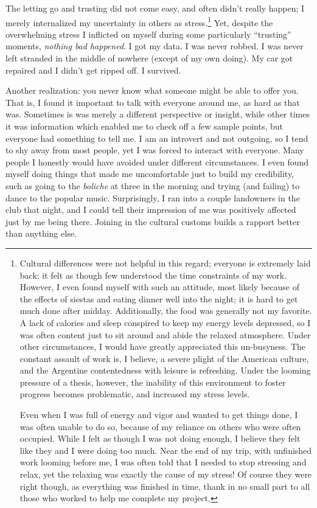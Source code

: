 The letting go and trusting did not come easy, and often didn’t really happen; I merely internalized my uncertainty in others as stress.\footnote{Cultural differences were not helpful in this regard; everyone is extremely laid back; it felt as though few understood the time constraints of my work. However, I even found myself with such an attitude, most likely because of the effects of siestas and eating dinner well into the night; it is hard to get much done after midday. Additionally, the food was generally not my favorite. A lack of calories and sleep conspired to keep my energy levels depressed, so I was often content just to sit around and abide the relaxed atmosphere. Under other circumstances, I would have greatly appreciated this un-busyness. The constant assault of work is, I believe, a severe plight of the American culture, and the Argentine contentedness with leisure is refreshing. Under the looming pressure of a thesis, however, the inability of this environment to foster progress becomes problematic, and increased my stress levels.

Even when I was full of energy and vigor and wanted to get things done, I was often unable to do so, because of my reliance on others who were often occupied. While I felt as though I was not doing enough, I believe they felt like they and I were doing too much. Near the end of my trip, with unfinished work looming before me, I was often told that I needed to stop stressing and relax, yet the relaxing was exactly the cause of my stress! Of course they were right though, as everything was finished in time, thank in no small part to all those who worked to help me complete my project.} Yet, despite the overwhelming stress I inflicted on myself during some particularly “trusting” moments, \textit{nothing bad happened}. I got my data. I was never robbed. I was never left stranded in the middle of nowhere (except of my own doing). My car got repaired and I didn't get ripped off. I survived.

Another realization: you never know what someone might be able to offer you. That is, I found it important to talk with everyone around me, as hard as that was. Sometimes is was merely a different perspective or insight, while other times it was information which enabled me to check off a few sample points, but everyone had something to tell me. I am an introvert and not outgoing, so I tend to shy away from most people, yet I was forced to interact with everyone. Many people I honestly would have avoided under different circumstances. I even found myself doing things that made me uncomfortable just to build my credibility, such as going to the \textit{boliche} at three in the morning and trying (and failing) to dance to the popular music. Surprisingly, I ran into a couple landowners in the club that night, and I could tell their impression of me was positively affected just by me being there. Joining in the cultural customs builds a rapport better than anything else.

